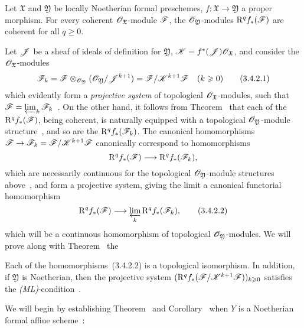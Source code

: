 \begin{theorem}[3.4.2]
\label{3.3.4.2}
Let $\mathfrak{X}$ and $\mathfrak{Y}$ be locally Noetherian formal preschemes, $f:\mathfrak{X}\to\mathfrak{Y}$ a proper morphism.
For every coherent $\mathscr{O}_\mathfrak{X}$-module $\mathscr{F}$, the $\mathscr{O}_\mathfrak{Y}$-modules $\mathrm{R}^q f_*(\mathscr{F})$ are coherent for all $q\geq 0$.
\end{theorem}

Let $\mathscr{J}$ be a sheaf of ideals of definition for $\mathfrak{Y}$, $\mathscr{K}=f^*(\mathscr{J})\mathscr{O}_\mathfrak{X}$, and consider the $\mathscr{O}_\mathfrak{X}$-modules
\[
\label{3.3.4.2.1}
  \mathscr{F}_k=\mathscr{F}\otimes_{\mathscr{O}_\mathfrak{Y}}(\mathscr{O}_\mathfrak{Y}/\mathscr{J}^{k+1})=\mathscr{F}/\mathscr{K}^{k+1}\mathscr{F}\quad(k\geqslant 0)
  \tag{3.4.2.1}
\]
which evidently form a \emph{projective system} of topological $\mathscr{O}_\mathfrak{X}$-modules, such that
$\mathscr{F}=\varprojlim_k\mathscr{F}_k$~.
On the other hand, it follows from Theorem~ that each of the $\mathrm{R}^q f_*(\mathscr{F})$, being coherent, is naturally equipped with a topological $\mathscr{O}_\mathfrak{Y}$-module structure~, and so are the $\mathrm{R}^q f_*(\mathscr{F}_k)$.
The canonical homomorphisms $\sh{F}\to\sh{F}_k=\sh{F}/\sh{K}^{k+1}\sh{F}$ canonically correspond to homomorphisms
\[
  \RR^q f_*(\sh{F})\to\RR^q f_*(\sh{F}_k),
\]
which are necessarily continuous for the topological $\mathscr{O}_\mathfrak{Y}$-module structures above~, and form a projective system, giving the limit a canonical functorial homomorphism
\[
\label{3.3.4.2.2}
  \RR^q f_*(\sh{F})\to\varprojlim_k\RR^q f_*(\sh{F}_k),
  \tag{3.4.2.2}
\]
which will be a continuous homomorphism of topological $\mathscr{O}_\mathfrak{Y}$-modules.
We will prove along with Theorem~ the
\begin{corollary}[3.4.3]
\label{3.3.4.3}
Each of the homomorphisms~(3.4.2.2) is a topological isomorphism.
In addition, if $\mathfrak{Y}$ is Noetherian, then the projective system $(\mathrm{R}^q f_*(\mathscr{F}/\mathscr{K}^{k+1}\mathscr{F}))_{k\geqslant 0}$ satisfies the \emph{(ML)}-condition~.
\end{corollary}
We will begin by establishing Theorem~ and Corollary~ when $Y$ is a Noetherian formal affine scheme~:
